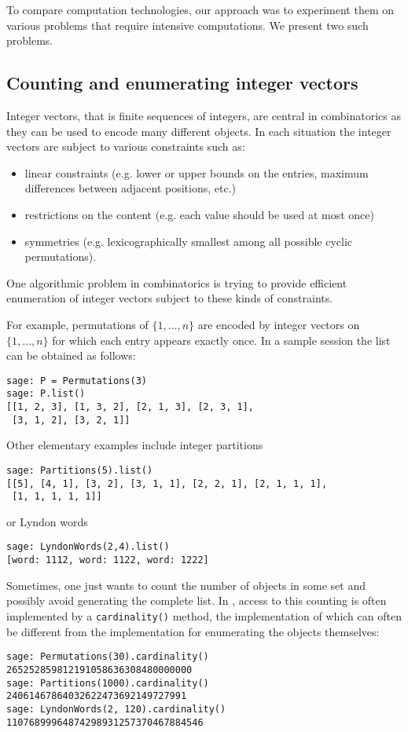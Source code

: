 \documentclass{deliverablereport}
\begin{document}
To compare computation technologies, our approach was to experiment
them on various problems that require intensive computations. We present two such problems.

\subsection{Counting and enumerating integer vectors}
\label{subsec:intro:integer:vectors}

Integer vectors, that is finite sequences of integers, are central
in combinatorics as they can be used to encode many different
objects. In each situation the integer vectors are subject to various
constraints such as:
\begin{itemize}
\item linear constraints (e.g. lower or upper bounds on the entries,
maximum differences between adjacent positions, etc.)
\item restrictions on the content (e.g. each value should be used
at most once)
\item symmetries (e.g. lexicographically smallest among all possible
cyclic permutations).
\end{itemize}
One algorithmic problem in combinatorics is trying to provide
efficient enumeration of integer vectors subject to these kinds of
constraints.

For example, permutations of $\{1, \ldots, n\}$ are encoded by integer vectors
on $\{1, \ldots, n\}$ for which each entry appears exactly once. In a sample
\Sage session the list can be obtained as follows:
\begin{verbatim}
sage: P = Permutations(3)
sage: P.list()
[[1, 2, 3], [1, 3, 2], [2, 1, 3], [2, 3, 1],
 [3, 1, 2], [3, 2, 1]]
\end{verbatim}
Other elementary examples include integer partitions
\begin{verbatim}
sage: Partitions(5).list()
[[5], [4, 1], [3, 2], [3, 1, 1], [2, 2, 1], [2, 1, 1, 1],
 [1, 1, 1, 1, 1]]
\end{verbatim}
or Lyndon words
\begin{verbatim}
sage: LyndonWords(2,4).list()
[word: 1112, word: 1122, word: 1222]
\end{verbatim}

Sometimes, one just wants to count the number of objects in some set and possibly
avoid generating the complete list. In \Sage, access to this
counting is often implemented by a {\tt cardinality()} method, the
implementation of which can often be different from the implementation for
enumerating the objects themselves:
\begin{verbatim}
sage: Permutations(30).cardinality()
265252859812191058636308480000000
sage: Partitions(1000).cardinality()
24061467864032622473692149727991
sage: LyndonWords(2, 120).cardinality()
11076899964874298931257370467884546
\end{verbatim}
\end{document}
